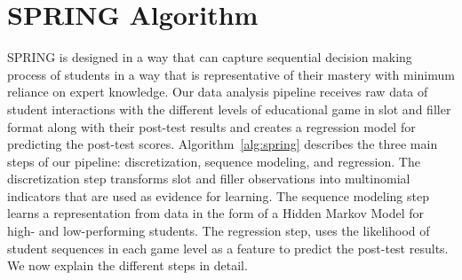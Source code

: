 \documentclass{sigchi}
\def\algname{SPRING\xspace}
\begin{document}

	
	
	
	\section{SPRING Algorithm}
	\label{sec:spring}
	
	
	\algname is designed in a way that can capture sequential decision making process of students in a way that is representative of their mastery with minimum reliance on expert knowledge. 
	Our data analysis pipeline receives raw data of student interactions with the different levels of educational game in slot and filler format along with their post-test results and creates a regression model for predicting the post-test scores. 
	Algorithm~\ref{alg:spring} describes the three main steps of our pipeline: discretization,  sequence modeling, and regression.
	The discretization step transforms slot and filler observations into multinomial indicators that are used as evidence for learning.
	The sequence modeling step learns a representation from data in the form of a Hidden Markov Model for high- and low-performing students.
	The regression step, uses the likelihood of student sequences in each game level as a feature to predict the post-test results.
	We now explain the different steps in detail.
	
\end{document}
